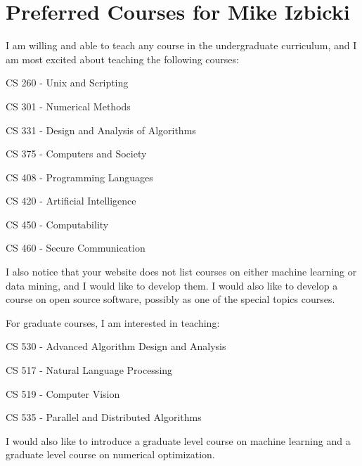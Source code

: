 \documentclass[12pt]{article}
\begin{document}
\section*{Preferred Courses for Mike Izbicki}

I am willing and able to teach any course in the undergraduate curriculum,
and I am most excited about teaching the following courses:

    CS 260 - Unix and Scripting 

    CS 301 - Numerical Methods 

    CS 331 - Design and Analysis of Algorithms 

    CS 375 - Computers and Society 

    CS 408 - Programming Languages 

    CS 420 - Artificial Intelligence 

    CS 450 - Computability 

    CS 460 - Secure Communication 

\noindent
I also notice that your website does not list courses on either machine learning or data mining,
and I would like to develop them.
I would also like to develop a course on open source software, possibly as one of the special topics courses.

\vspace{0.15in}
\noindent
For graduate courses, I am interested in teaching:

    CS 530 - Advanced Algorithm Design and Analysis 

    CS 517 - Natural Language Processing 

    CS 519 - Computer Vision 

	CS 535 - Parallel and Distributed Algorithms

\noindent
I would also like to introduce a graduate level course on machine learning and a graduate level course on numerical optimization.
\end{document}
